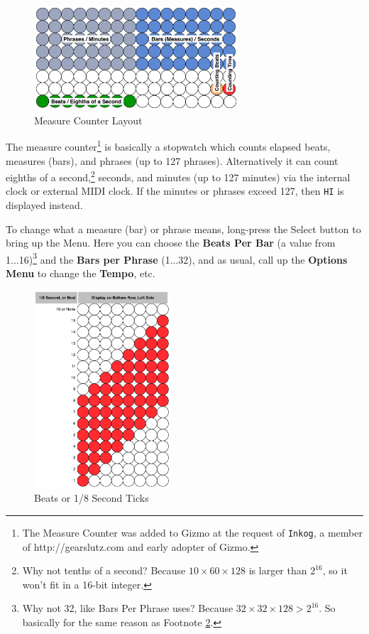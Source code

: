 \documentclass{article}
\begin{document}
\begin{figure}
\vspace{-1.5em}\includegraphics[width=3in]{measure}
\vspace{-2em}\caption{\small Measure Counter Layout}
\vspace{-1em}\label{measurecounter}
\end{figure}

	The measure counter\footnote{The Measure Counter was added to Gizmo at the request of \texttt{Inkog}, a member of http:/\!/gearslutz.com and early adopter of Gizmo.} is basically a stopwatch which counts elapsed beats, measures (bars), and phrases (up to 127 phrases).  Alternatively it can count eighths of a second,\footnote{\label{footnotetenths}Why not tenths of a second?  Because \(10 \times 60 \times 128\) is larger than \(2^{16}\), so it won't fit in a 16-bit integer.} seconds, and minutes (up to 127 minutes) via the internal clock or external MIDI clock.  If the minutes or phrases exceed 127, then \texttt{HI} is displayed instead.
	
	To change what a measure (bar) or phrase means, long-press the Select button to bring up the Menu.  Here you can choose the {\bf Beats Per Bar} (a value from 1...16)\footnote{Why not 32, like Bars Per Phrase uses?  Because \(32 \times 32 \times 128 > 2^{16}\).  So basically for the same reason as Footnote \ref{footnotetenths}.} and the {\bf Bars per Phrase} (1...32), and as usual, call up the {\bf Options Menu} to change the {\bf Tempo}, etc.
	
\begin{figure}
\includegraphics[width=2in]{measurebeats}
\vspace{-2em}\caption{\small Beats or 1/8 Second Ticks}\vspace{-3em}
\label{midichannelvalues}
\end{figure}
\end{document}

